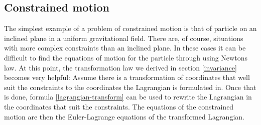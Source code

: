 \documentclass[prb,preprint]{revtex4-1}
\begin{document}
\subsection{Constrained motion \cite{Kuypers}}
The simplest example of a problem of constrained motion is that of particle on an inclined plane in a uniform gravitational field. There are, of course, situations with more complex constraints than an inclined plane. In these cases it can be difficult to find the equations of motion for the particle through using Newtons law. At this point, the transformation law we derived in section \ref{invariance} becomes very helpful: Assume there is a transformation of coordinates that well suit the constraints to the coordinates the Lagrangian is formulated in. Once that is done, formula \ref{lagrangian-transform} can be used to rewrite the Lagrangian in the coordinates that suit the constraints. The equations of the constrained motion are then the Euler-Lagrange equations of the transformed Lagrangian.















\end{document}
